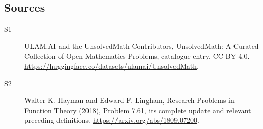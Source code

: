 \documentclass[11pt]{article}
\begin{document}
\subsection{Sources}
\begin{description}
\item[\hypertarget{source:statement:1}{S1}] ULAM.AI and the UnsolvedMath Contributors, UnsolvedMath: A Curated Collection of Open Mathematics Problems, catalogue entry. CC BY 4.0. \url{https://huggingface.co/datasets/ulamai/UnsolvedMath}.
\item[\hypertarget{source:statement:2}{S2}] Walter K. Hayman and Edward F. Lingham, Research Problems in Function Theory (2018), Problem 7.61, its complete update and relevant preceding definitions. \url{https://arxiv.org/abs/1809.07200}.
\end{description}
\label{end:statement}
\end{document}
